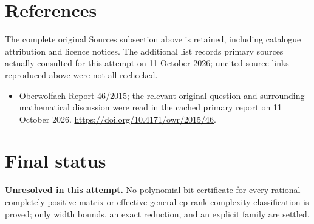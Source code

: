 \documentclass[11pt]{article}
\begin{document}
\section{References}
The complete original Sources subsection above is retained, including catalogue attribution and licence notices. The additional list records primary sources actually consulted for this attempt on 11 October 2026; uncited source links reproduced above were not all rechecked.
\begin{itemize}
\item Oberwolfach Report 46/2015; the relevant original question and surrounding mathematical discussion were read in the cached primary report on 11 October 2026. \url{https://doi.org/10.4171/owr/2015/46}.
\end{itemize}
\section{Final status}
\textbf{Unresolved in this attempt.} No polynomial-bit certificate for every rational completely positive matrix or effective general cp-rank complexity classification is proved; only width bounds, an exact reduction, and an explicit family are settled.
\end{document}
